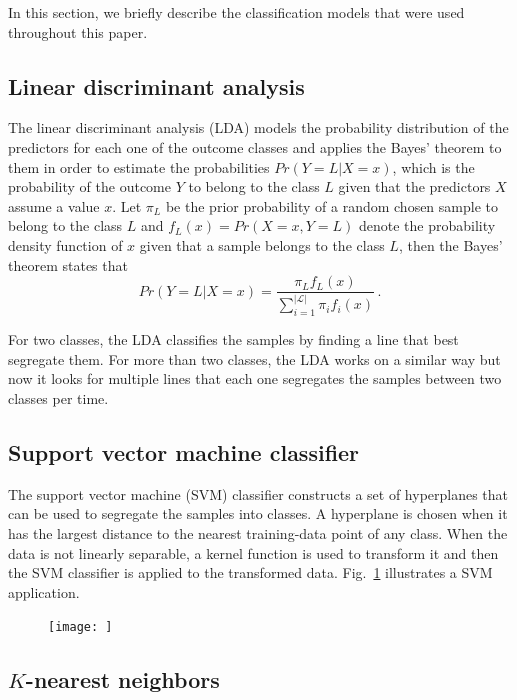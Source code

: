 \documentclass[conference]{IEEEtran}
\begin{document}
In this section, we briefly describe the classification models that were used throughout this paper.

\subsection{Linear discriminant analysis}
The linear discriminant analysis (LDA) models the probability distribution of the predictors for each one of the outcome classes and applies the Bayes' theorem to them in order to estimate the probabilities $Pr(Y=L | X=x)$, which is the probability of the outcome $Y$ to belong to the class $L$ given that the predictors $X$ assume a value $x$. Let $\pi_L$ be the prior probability of a random chosen sample to belong to the class $L$ and $f_L(x) = Pr(X=x, Y=L)$ denote the probability density function of $x$ given that a sample belongs to the class $L$, then the Bayes' theorem states that
%
\begin{equation}
  Pr(Y=L | X=x) = \frac{\pi_L f_L(x)}{\sum_{i = 1}^{|\mathcal{L}|} \pi_i f_i(x)}\,.
\end{equation}

For two classes, the LDA classifies the samples by finding a line that best segregate them. For more than two classes, the LDA works on a similar way but now it looks for multiple lines that each one segregates the samples between two classes per time.

\subsection{Support vector machine classifier}

The support vector machine (SVM) classifier constructs a set of hyperplanes that can be used to segregate the samples into classes. A hyperplane is chosen when it has the largest distance to the nearest training-data point of any class. When the data is not linearly separable, a kernel function is used to transform it and then the SVM classifier is applied to the transformed data. Fig.~\ref{fig:svm} illustrates a SVM application.

\begin{figure}
  \texttt{[image: ]}
  \caption{}
  \label{fig:svm}
\end{figure}

\subsection{$K$-nearest neighbors}
\end{document}
